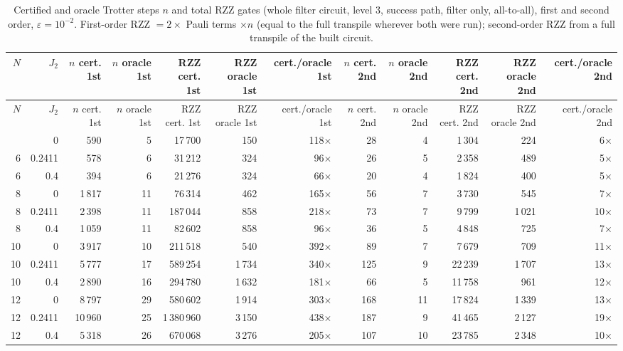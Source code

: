 \documentclass[11pt]{article}
\begin{document}
{\small
\begin{longtable}{rrrrrrrrrrrr}
\caption{Certified and oracle Trotter steps $n$ and total RZZ gates (whole filter circuit, level 3, success path, filter only, all-to-all), first and second order, $\varepsilon=10^{-2}$. First-order RZZ $=2\times$ Pauli terms $\times n$ (equal to the full transpile wherever both were run); second-order RZZ from a full transpile of the built circuit.}\label{tab:so1}\\
\toprule
$N$ & $J_2$ & $n$ cert. 1st & $n$ oracle 1st & RZZ cert. 1st & RZZ oracle 1st & cert./oracle 1st & $n$ cert. 2nd & $n$ oracle 2nd & RZZ cert. 2nd & RZZ oracle 2nd & cert./oracle 2nd \\
\midrule
\endfirsthead
\toprule
$N$ & $J_2$ & $n$ cert. 1st & $n$ oracle 1st & RZZ cert. 1st & RZZ oracle 1st & cert./oracle 1st & $n$ cert. 2nd & $n$ oracle 2nd & RZZ cert. 2nd & RZZ oracle 2nd & cert./oracle 2nd \\
\midrule
\endhead
\bottomrule
\endfoot
6 & 0 & 590 & 5 & 17\,700 & 150 & 118$\times$ & 28 & 4 & 1\,304 & 224 & 6$\times$ \\
6 & 0.2411 & 578 & 6 & 31\,212 & 324 & 96$\times$ & 26 & 5 & 2\,358 & 489 & 5$\times$ \\
6 & 0.4 & 394 & 6 & 21\,276 & 324 & 66$\times$ & 20 & 4 & 1\,824 & 400 & 5$\times$ \\
8 & 0 & 1\,817 & 11 & 76\,314 & 462 & 165$\times$ & 56 & 7 & 3\,730 & 545 & 7$\times$ \\
8 & 0.2411 & 2\,398 & 11 & 187\,044 & 858 & 218$\times$ & 73 & 7 & 9\,799 & 1\,021 & 10$\times$ \\
8 & 0.4 & 1\,059 & 11 & 82\,602 & 858 & 96$\times$ & 36 & 5 & 4\,848 & 725 & 7$\times$ \\
10 & 0 & 3\,917 & 10 & 211\,518 & 540 & 392$\times$ & 89 & 7 & 7\,679 & 709 & 11$\times$ \\
10 & 0.2411 & 5\,777 & 17 & 589\,254 & 1\,734 & 340$\times$ & 125 & 9 & 22\,239 & 1\,707 & 13$\times$ \\
10 & 0.4 & 2\,890 & 16 & 294\,780 & 1\,632 & 181$\times$ & 66 & 5 & 11\,758 & 961 & 12$\times$ \\
12 & 0 & 8\,797 & 29 & 580\,602 & 1\,914 & 303$\times$ & 168 & 11 & 17\,824 & 1\,339 & 13$\times$ \\
12 & 0.2411 & 10\,960 & 25 & 1\,380\,960 & 3\,150 & 438$\times$ & 187 & 9 & 41\,465 & 2\,127 & 19$\times$ \\
12 & 0.4 & 5\,318 & 26 & 670\,068 & 3\,276 & 205$\times$ & 107 & 10 & 23\,785 & 2\,348 & 10$\times$ \\
\end{longtable}
}
\end{document}
